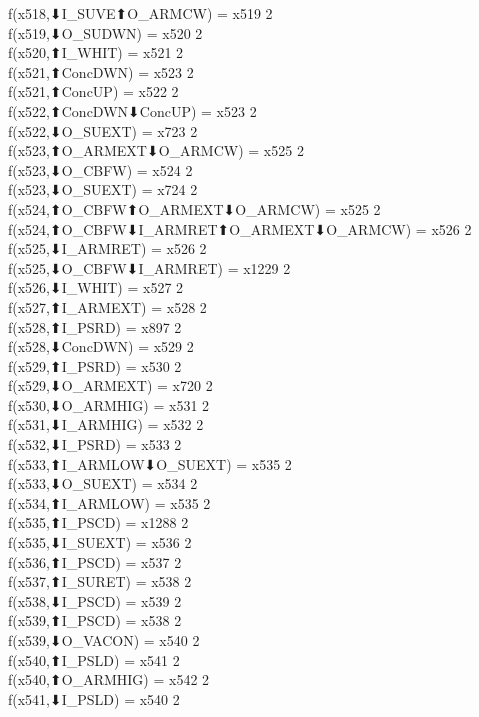 f(x518,⬇I_SUVE⬆O_ARMCW) = x519 {2} \\
f(x519,⬇O_SUDWN) = x520 {2} \\
f(x520,⬆I_WHIT) = x521 {2} \\
f(x521,⬆ConcDWN) = x523 {2} \\
f(x521,⬆ConcUP) = x522 {2} \\
f(x522,⬆ConcDWN⬇ConcUP) = x523 {2} \\
f(x522,⬇O_SUEXT) = x723 {2} \\
f(x523,⬆O_ARMEXT⬇O_ARMCW) = x525 {2} \\
f(x523,⬇O_CBFW) = x524 {2} \\
f(x523,⬇O_SUEXT) = x724 {2} \\
f(x524,⬆O_CBFW⬆O_ARMEXT⬇O_ARMCW) = x525 {2} \\
f(x524,⬆O_CBFW⬇I_ARMRET⬆O_ARMEXT⬇O_ARMCW) = x526 {2} \\
f(x525,⬇I_ARMRET) = x526 {2} \\
f(x525,⬇O_CBFW⬇I_ARMRET) = x1229 {2} \\
f(x526,⬇I_WHIT) = x527 {2} \\
f(x527,⬆I_ARMEXT) = x528 {2} \\
f(x528,⬆I_PSRD) = x897 {2} \\
f(x528,⬇ConcDWN) = x529 {2} \\
f(x529,⬆I_PSRD) = x530 {2} \\
f(x529,⬇O_ARMEXT) = x720 {2} \\
f(x530,⬇O_ARMHIG) = x531 {2} \\
f(x531,⬇I_ARMHIG) = x532 {2} \\
f(x532,⬇I_PSRD) = x533 {2} \\
f(x533,⬆I_ARMLOW⬇O_SUEXT) = x535 {2} \\
f(x533,⬇O_SUEXT) = x534 {2} \\
f(x534,⬆I_ARMLOW) = x535 {2} \\
f(x535,⬆I_PSCD) = x1288 {2} \\
f(x535,⬇I_SUEXT) = x536 {2} \\
f(x536,⬆I_PSCD) = x537 {2} \\
f(x537,⬆I_SURET) = x538 {2} \\
f(x538,⬇I_PSCD) = x539 {2} \\
f(x539,⬆I_PSCD) = x538 {2} \\
f(x539,⬇O_VACON) = x540 {2} \\
f(x540,⬆I_PSLD) = x541 {2} \\
f(x540,⬆O_ARMHIG) = x542 {2} \\
f(x541,⬇I_PSLD) = x540 {2} \\
